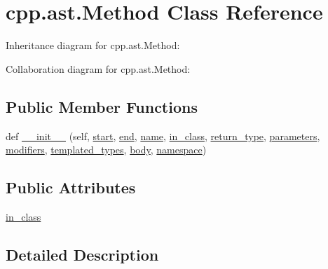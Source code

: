 \hypertarget{classcpp_1_1ast_1_1_method}{}\section{cpp.\+ast.\+Method Class Reference}
\label{classcpp_1_1ast_1_1_method}


Inheritance diagram for cpp.\+ast.\+Method\+:


Collaboration diagram for cpp.\+ast.\+Method\+:
\subsection*{Public Member Functions}
\begin{DoxyCompactItemize}
\item 
def \hyperlink{classcpp_1_1ast_1_1_method_aa3cbdc9c4b7e92b15fa6acea0dbf2322}{\+\_\+\+\_\+init\+\_\+\+\_\+} (self, \hyperlink{classcpp_1_1ast_1_1_node_a7b2aa97e6a049bb1a93aea48c48f1f44}{start}, \hyperlink{classcpp_1_1ast_1_1_node_a3c5e5246ccf619df28eca02e29d69647}{end}, \hyperlink{classcpp_1_1ast_1_1___generic_declaration_af774f4729dfd78d0538a6782fe8514c1}{name}, \hyperlink{classcpp_1_1ast_1_1_method_aa67244c3673afed43398b5d3e3fa6c1c}{in\+\_\+class}, \hyperlink{classcpp_1_1ast_1_1_function_af750fd788d7ab33163ee066534780212}{return\+\_\+type}, \hyperlink{classcpp_1_1ast_1_1_function_a0e61ef47af9cf2fd4402dbd8cab631ef}{parameters}, \hyperlink{classcpp_1_1ast_1_1_function_ad30eed435f1ff9ff34ade9cc0d7be121}{modifiers}, \hyperlink{classcpp_1_1ast_1_1_function_a57bb03218bade3240137a0d91c467cb6}{templated\+\_\+types}, \hyperlink{classcpp_1_1ast_1_1_function_a8e25e5016b23b38e32acf2df529c0650}{body}, \hyperlink{classcpp_1_1ast_1_1___generic_declaration_a8aee3f11b37449d54b42a78e0a689f46}{namespace})
\end{DoxyCompactItemize}
\subsection*{Public Attributes}
\begin{DoxyCompactItemize}
\item 
\hyperlink{classcpp_1_1ast_1_1_method_aa67244c3673afed43398b5d3e3fa6c1c}{in\+\_\+class}
\end{DoxyCompactItemize}


\subsection{Detailed Description}


